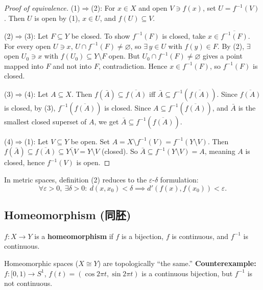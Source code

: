\documentclass{article}
\begin{document}
\begin{proof}[Proof of equivalence]
  (1)$\Rightarrow$(2): For $x \in X$ and open $V \ni f(x)$, set $U = f^{-1}(V)$.
  Then $U$ is open by (1), $x \in U$, and $f(U) \subseteq V$.

  (2)$\Rightarrow$(3): Let $F \subseteq Y$ be closed. To show
  $f^{-1}(F)$ is closed,
  take $x \in \overline{f^{-1}(F)}$. For every open $U \ni x$, $U
  \cap f^{-1}(F) \ne \varnothing$,
  so $\exists\, y \in U$ with $f(y) \in F$.
  By (2), $\exists$ open $U_0 \ni x$ with $f(U_0) \subseteq Y \setminus F$ open.
  But $U_0 \cap f^{-1}(F) \ne \varnothing$ gives a point mapped into
  $F$ and not into $F$, contradiction.
  Hence $x \in f^{-1}(F)$, so $f^{-1}(F)$ is closed.

  (3)$\Rightarrow$(4): Let $A \subseteq X$. Then $f(\bar{A})
  \subseteq \overline{f(A)}$ iff
  $\bar{A} \subseteq f^{-1}(\overline{f(A)})$. Since
  $\overline{f(A)}$ is closed, by (3),
  $f^{-1}(\overline{f(A)})$ is closed. Since $A \subseteq
  f^{-1}(\overline{f(A)})$, and $\bar{A}$
  is the smallest closed superset of $A$, we get $\bar{A} \subseteq
  f^{-1}(\overline{f(A)})$.

  (4)$\Rightarrow$(1): Let $V \subseteq Y$ be open. Set $A = X
  \setminus f^{-1}(V) = f^{-1}(Y \setminus V)$.
  Then $f(\bar{A}) \subseteq \overline{f(A)} \subseteq \overline{Y
  \setminus V} = Y \setminus V$ (closed).
  So $\bar{A} \subseteq f^{-1}(Y \setminus V) = A$, meaning $A$ is
  closed, hence $f^{-1}(V)$ is open.
\end{proof}

In metric spaces, definition (2) reduces to the
$\varepsilon$-$\delta$ formulation:
\[
  \forall \varepsilon > 0,\ \exists \delta > 0 :\ d(x, x_0) < \delta
  \implies d'(f(x), f(x_0)) < \varepsilon.
\]

\subsection{Homeomorphism (同胚)}\label{def:homeomorphism}
\begin{definition}
  $f : X \to Y$ is a \textbf{homeomorphism} if $f$ is a bijection,
  $f$ is continuous, and $f^{-1}$ is continuous.
\end{definition}
Homeomorphic spaces ($X \cong Y$) are topologically ``the same.''
\textbf{Counterexample:} $f : [0,1) \to S^1$, $f(t) = (\cos 2\pi t,
\sin 2\pi t)$ is a continuous bijection, but $f^{-1}$ is not continuous.
\end{document}
